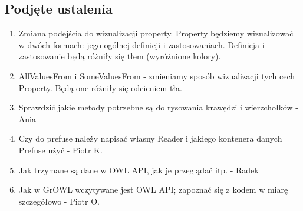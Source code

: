 \documentclass[a4paper,10pt]{article}
\begin{document}
\subsection{Podjęte ustalenia}
\begin{enumerate}
\item  Zmiana podejścia do wizualizacji property. Property będziemy wizualizować w dwóch formach: jego ogólnej definicji i zastosowaniach. Definicja i zastosowanie będą różniły się tłem (wyróżnione kolory).
\item  AllValuesFrom i SomeValuesFrom - zmieniamy sposób wizualizacji tych cech Property. Będą one różniły się odcieniem tła.  
\item  Sprawdzić jakie metody potrzebne są do rysowania krawędzi i wierzchołków - Ania
\item  Czy do prefuse należy napisać własny Reader i jakiego kontenera danych Prefuse użyć - Piotr K.
\item  Jak trzymane są dane w OWL API, jak je przeglądać itp. - Radek
\item  Jak w GrOWL wczytywane jest OWL API; zapoznać się z kodem w miarę szczegółowo - Piotr O.
\end{enumerate}
\end{document}
